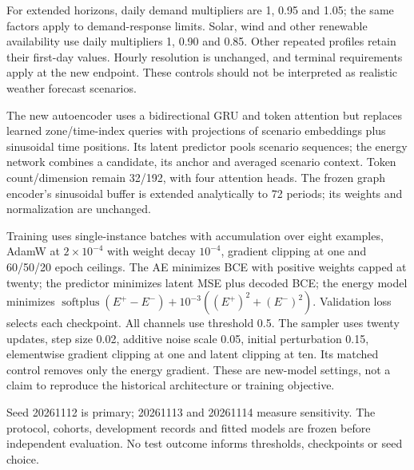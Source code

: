 For extended horizons, daily demand multipliers are 1, 0.95 and 1.05;
the same factors apply to demand-response limits. Solar, wind and other
renewable availability use daily multipliers 1, 0.90 and 0.85.
Other repeated profiles retain their first-day values.
Hourly resolution is unchanged, and terminal requirements apply at the new
endpoint. These controls should not be interpreted as realistic weather
forecast scenarios.

The new autoencoder uses a bidirectional GRU and token attention but replaces
learned zone/time-index queries with projections of scenario embeddings plus
sinusoidal time positions. Its latent predictor pools scenario sequences;
the energy network combines a candidate, its anchor and averaged scenario
context. Token count/dimension remain 32/192, with four attention heads.
The frozen graph encoder's sinusoidal buffer is extended analytically to
72 periods; its weights and normalization are unchanged.

Training uses single-instance batches with accumulation over eight examples,
AdamW at $2\times10^{-4}$ with weight decay $10^{-4}$, gradient clipping at one
and 60/50/20 epoch ceilings.
The AE minimizes BCE with positive weights capped at twenty; the predictor
minimizes latent MSE plus decoded BCE; the energy model minimizes
$\operatorname{softplus}(E^+-E^-)+10^{-3}((E^+)^2+(E^-)^2)$.
Validation loss selects each checkpoint. All channels use threshold 0.5.
The sampler uses twenty updates, step size 0.02, additive noise scale 0.05,
initial perturbation 0.15, elementwise gradient clipping at one and latent
clipping at ten. Its matched control removes only the energy gradient.
These are new-model settings, not a claim to reproduce the historical
architecture or training objective.

Seed 20261112 is primary; 20261113 and 20261114 measure sensitivity.
The protocol, cohorts, development records and fitted models are frozen
before independent evaluation. No test outcome informs thresholds,
checkpoints or seed choice.
